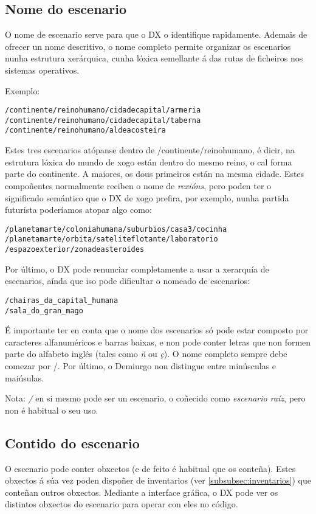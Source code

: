 \subsection{Nome do escenario}
\label{subsec:nome-escenarios}
O nome de escenario serve para que o DX o identifique rapidamente. Ademais de
ofrecer un nome descritivo, o nome completo permite organizar os escenarios
nunha estrutura xerárquica, cunha lóxica semellante á das rutas de ficheiros nos
sistemas operativos.
\par
Exemplo:
\begin{lstlisting}
/continente/reinohumano/cidadecapital/armeria
/continente/reinohumano/cidadecapital/taberna
/continente/reinohumano/aldeacosteira
\end{lstlisting}
\par
Estes tres escenarios atópanse dentro de /continente/reinohumano, é dicir,
na estrutura lóxica do mundo de xogo están dentro do mesmo reino, o cal forma
parte do continente. A maiores, os dous primeiros están na mesma cidade. Estes
compoñentes normalmente reciben o nome de {\it rexións}, pero poden ter o
significado semántico que o DX de xogo prefira, por exemplo, nunha partida
futurista poderíamos atopar algo como:
\begin{lstlisting}
/planetamarte/coloniahumana/suburbios/casa3/cocinha
/planetamarte/orbita/sateliteflotante/laboratorio
/espazoexterior/zonadeasteroides
\end{lstlisting}
\par
Por último, o DX pode renunciar completamente a usar a xerarquía de escenarios,
aínda que iso pode dificultar o nomeado de escenarios:
\begin{lstlisting}
/chairas_da_capital_humana
/sala_do_gran_mago
\end{lstlisting}
\par
É importante ter en conta que o nome dos escenarios só pode estar composto por
caracteres alfanuméricos e barras baixas, e non pode conter letras que non
formen parte do alfabeto inglés (tales como {\it ñ} ou {\it ç}). O nome completo
sempre debe comezar por /. Por último, o Demiurgo non distingue entre
minúsculas e maiúsulas.
\par
Nota: {\it /} en si mesmo pode ser un escenario, o coñecido como {\it escenario
raíz}, pero non é habitual o seu uso.

\subsection{Contido do escenario}
O escenario pode conter obxectos (e de feito é habitual que os conteña). Estes
obxectos á súa vez poden dispoñer de inventarios (ver \ref{subsubsec:inventarios})
que conteñan outros obxectos. Mediante a interface gráfica, o DX pode ver os
distintos obxectos do escenario para operar con eles no código.

